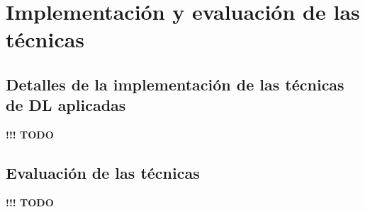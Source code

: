 \section{Implementación y evaluación de las técnicas}


\subsection{Detalles de la implementación de las técnicas de DL aplicadas}


\textbf{!!! TODO}

\subsection{Evaluación de las técnicas}


\textbf{!!! TODO}